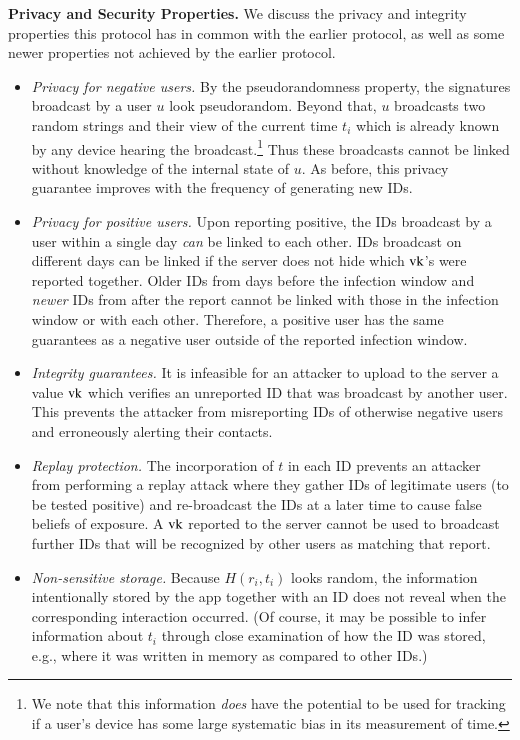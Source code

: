 {\bf Privacy and Security Properties.} We discuss the privacy and integrity properties this protocol has in common with the earlier protocol, as well as some newer properties not achieved by the earlier protocol.\begin{itemize}
    \item {\em Privacy for negative users.} 
	 By the pseudorandomness property, the signatures broadcast by a user $u$ look pseudorandom. Beyond that, $u$ broadcasts two random strings and their view of the current time $t_i$ which is already known by any device hearing the broadcast.\footnote{We note that this information \emph{does} have the potential to be used for tracking if a user's device has some large systematic bias in its measurement of time.} Thus these broadcasts cannot be linked without knowledge of the internal state of $u$. As before, this privacy guarantee improves with the frequency of generating new IDs.
    \item {\em Privacy for positive users.} Upon reporting positive, the IDs broadcast by a user within a single day {\em can} be linked to each other. IDs broadcast on different days can be linked if the server does not hide which $\mathrm{vk}$'s were reported together. Older IDs from days before the infection window and {\em newer} IDs from after the report cannot be linked with those in the infection window or with each other. Therefore, a positive user has the same guarantees as a negative user outside of the reported infection window.
    \item {\em Integrity guarantees.} It is infeasible for an attacker to upload to the server a value $\mathrm{vk}$ which verifies an unreported ID that was broadcast by another user. This prevents the attacker from misreporting IDs of otherwise negative users and erroneously alerting their contacts.
    \item {\em Replay protection.} The incorporation of $t$ in each ID prevents an attacker from performing a replay attack where they gather IDs of legitimate users (to be tested positive) and re-broadcast the IDs at a later time to cause false beliefs of exposure. A $\mathrm{vk}$ reported to the server cannot be used to broadcast further IDs that will be recognized by other users as matching that report.
    \item {\em Non-sensitive storage.} Because $H(r_i, t_i)$ looks random, the information intentionally stored by the app together with an ID does not reveal when the corresponding interaction occurred. (Of course, it may be possible to infer information about $t_i$ through close examination of how the ID was stored, e.g., where it was written in memory as compared to other IDs.)
\end{itemize}




 


